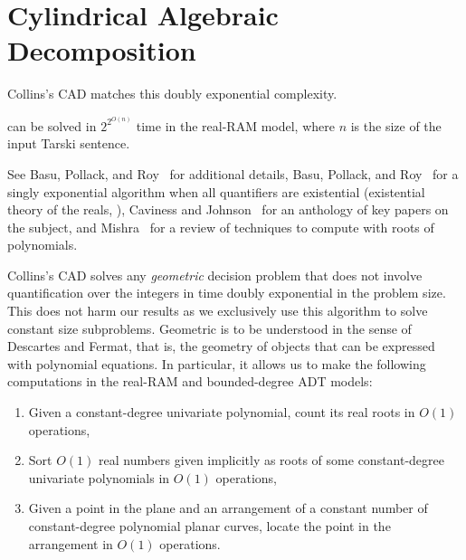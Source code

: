 \section{Cylindrical Algebraic Decomposition}
%
Collins's CAD matches this doubly exponential complexity.
\begin{theorem}
	\FOTR{} can be solved in $2^{2^{O(n)}}$ time in the real-RAM model, where
	\(n\) is the size of the input Tarski sentence.
\end{theorem}

See
Basu, Pollack, and Roy~\cite{BPR06} for additional details,
Basu, Pollack, and Roy~\cite{BPR96b} for a singly exponential algorithm when all
quantifiers are existential
(existential theory of the reals, \ETR{}),
Caviness and Johnson~\cite{CJ12} for an anthology of key papers on the subject,
and Mishra~\cite{M04} for a review of techniques to compute with roots of
polynomials.

Collins's CAD solves any \emph{geometric} decision problem that does not involve
quantification over the integers in time doubly exponential in the problem
size. This does not harm our results as we exclusively use this algorithm to
solve constant size subproblems. Geometric is to be understood in the sense of Descartes and Fermat, that
is, the geometry of objects that can be expressed with polynomial equations. In
particular, it allows us to make the following computations in the real-RAM and
bounded-degree ADT models:
\begin{enumerate}
\setlength{\itemsep}{0pt}
\setlength{\parskip}{0pt}
\setlength{\parsep}{0pt}
\item Given a constant-degree univariate polynomial, count its real roots
	in $O(1)$ operations,
\item Sort $O(1)$ real numbers given implicitly as roots of some
	constant-degree univariate polynomials in $O(1)$ operations,
\item Given a point in the plane and an arrangement of a constant number of
constant-degree polynomial planar curves, locate the point in the
arrangement in $O(1)$ operations.
\end{enumerate}

